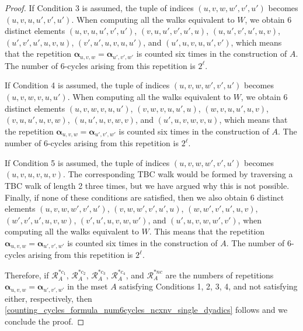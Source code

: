 \documentclass[11pt]{article}
\theoremstyle{plain}
\theoremstyle{plain}
\theoremstyle{definition}
\numberwithin{theo}{section}
\newcommand{\balpha}{{\boldsymbol \alpha}}
\newcounter{alp}
\newcounter{rom}
\begin{document}
\begin{proof}
If Condition 3 is assumed, the tuple of indices $(u,v,w,w',v',u')$ becomes $(u,v,u,u',v',u')$. 
When computing all the walks equivalent to $W$, we obtain 6 distinct elements $(u,v,u,u',v',u')$, $(v,u,u',v',u',u)$, $(u,u',v',u',u,v)$, $(u',v',u',u,v,u)$, $(v',u',u,v,u,u')$, and $(u',u,v,u,u',v')$, which means that the repetition $\balpha_{u,v,w}=\balpha_{u',v',w'}$ is counted six times in the construction of $A$. The number of 6-cycles arising from this repetition is $2^\ell$.

If Condition 4 is assumed, the tuple of indices $(u,v,w,w',v',u')$ becomes $(u,v,w,v,u,u')$. 
When computing all the walks equivalent to $W$, we obtain 6 distinct elements $(u,v,w,v,u,u')$, $(v,w,v,u,u',u)$, $(w,v,u,u',u,v)$, $(v,u,u',u,v,w)$, $(u,u',u,v,w,v)$, and $(u',u,v,w,v,u)$, which means that the repetition $\balpha_{u,v,w}=\balpha_{u',v',w'}$ is counted six times in the construction of $A$. The number of 6-cycles arising from this repetition is $2^\ell$.

If Condition 5 is assumed, the tuple of indices $(u,v,w,w',v',u')$ becomes $(u,v,u,v,u,v)$. The corresponding TBC walk would be formed by traversing a TBC walk of length 2 three times, but we have argued why this is not possible. Finally, if none of these conditions are satisfied, then we also obtain 6 distinct elements $(u,v,w,w',v',u')$, $(v,w,w',v',u',u)$, $(w,w',v',u',u,v)$, $(w',v',u',u,v,w)$, $(v',u',u,v,w,w')$, and $(u',u,v,w,w',v')$, when computing all the walks equivalent to $W$. This means that the repetition $\balpha_{u,v,w}=\balpha_{u',v',w'}$ is counted six times in the construction of $A$. The number of 6-cycles arising from this repetition is $2^\ell$.

Therefore, if $\mathcal{R}_{A}^{*c_1}$, $\mathcal{R}_{A}^{*c_2}$, $\mathcal{R}_{A}^{*c_3}$, $\mathcal{R}_{A}^{*c_4}$, and $\mathcal{R}_{A}^{*nc}$ are the numbers of repetitions $\balpha_{u,v,w}=\balpha_{u',v',w'}$ in the mset $A$ satisfying Conditions 1, 2, 3, 4, and not satisfying either, respectively, then \eqref{counting_cycles_formula_num6cycles_ncxnv_single_dyadics} follows and we conclude the proof.
\end{proof}
\end{document}
